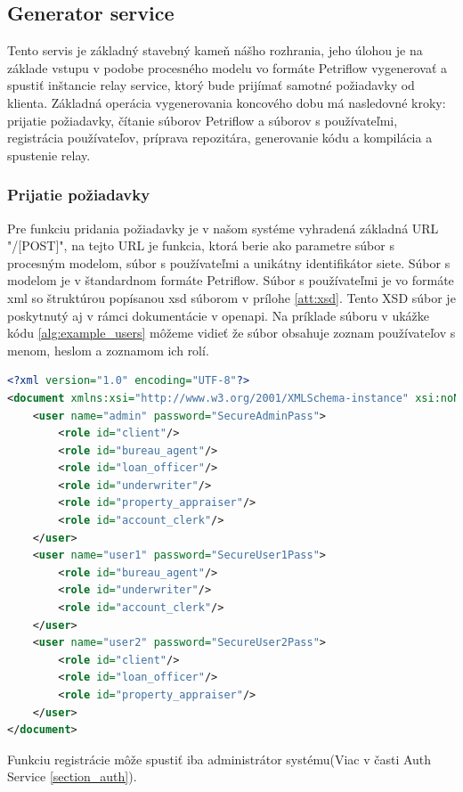 \subsection{Generator service}
Tento servis je základný stavebný kameň nášho rozhrania, jeho úlohou je na základe vstupu v podobe procesného modelu vo formáte Petriflow vygenerovať a spustiť inštancie relay service, ktorý bude prijímať samotné požiadavky od klienta. Základná operácia vygenerovania koncového dobu má nasledovné kroky:
prijatie požiadavky,
čítanie súborov Petriflow a súborov s používateľmi,
registrácia používateľov,
príprava repozitára,
generovanie kódu
a kompilácia a spustenie relay.

\subsubsection{Prijatie požiadavky}
Pre funkciu pridania požiadavky je v našom systéme vyhradená základná URL "/[POST]", na tejto URL je funkcia, ktorá berie ako parametre súbor s procesným modelom, súbor s používateľmi a unikátny identifikátor siete. Súbor s modelom je v štandardnom formáte Petriflow. Súbor s používateľmi je vo formáte \acrshort{xml} so štruktúrou popísanou \acrshort{xsd} súborom v prílohe \ref{att:xsd}. Tento XSD súbor je poskytnutý aj v rámci dokumentácie v \acrshort{openapi}. Na príklade súboru v ukážke kódu \ref{alg:example_users} môžeme vidieť že súbor obsahuje zoznam používateľov s menom, heslom a zoznamom ich rolí.

\begin{lstlisting}[float, caption={Príklad súboru s používateľmi},label={alg:example_users},language=XML]
<?xml version="1.0" encoding="UTF-8"?>
<document xmlns:xsi="http://www.w3.org/2001/XMLSchema-instance" xsi:noNamespaceSchemaLocation="./users_schema.xsd">
	<user name="admin" password="SecureAdminPass">
		<role id="client"/>
		<role id="bureau_agent"/>
		<role id="loan_officer"/>
		<role id="underwriter"/>
		<role id="property_appraiser"/>
		<role id="account_clerk"/>
	</user>
	<user name="user1" password="SecureUser1Pass">
		<role id="bureau_agent"/>
		<role id="underwriter"/>
		<role id="account_clerk"/>
	</user>
	<user name="user2" password="SecureUser2Pass">
		<role id="client"/>
		<role id="loan_officer"/>
		<role id="property_appraiser"/>
	</user>
</document>
\end{lstlisting}

Funkciu registrácie môže spustiť iba administrátor systému(Viac v časti Auth Service \ref{section_auth}).


